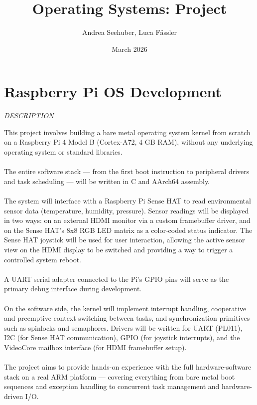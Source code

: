 \documentclass{article}
\title{Operating Systems: Project}
\author{Andrea Seehuber, Luca Fässler}
\date{March 2026}
\begin{document}
\maketitle

\appendix

\section*{Raspberry Pi OS Development}

\begin{center}
  \textit{DESCRIPTION}
\end{center}
This project involves building a bare metal operating system kernel from scratch on a Raspberry Pi 4 Model B (Cortex-A72, 4 GB RAM), without any underlying operating system or standard libraries.
\\\\
The entire software stack — from the first boot instruction to peripheral drivers and task scheduling — will be written in C and AArch64 assembly.
\\\\
The system will interface with a Raspberry Pi Sense HAT to read environmental sensor data (temperature, humidity, pressure). Sensor readings will be displayed in two ways: on an external HDMI monitor via a custom framebuffer driver, and on the Sense HAT's 8x8 RGB LED matrix as a color-coded status indicator. The Sense HAT joystick will be used for user interaction, allowing the active sensor view on the HDMI display to be switched and providing a way to trigger a controlled system reboot.
\\\\
A UART serial adapter connected to the Pi's GPIO pins will serve as the primary debug interface during development.
\\\\
On the software side, the kernel will implement interrupt handling, cooperative and preemptive context switching between tasks, and synchronization primitives such as spinlocks and semaphores. Drivers will be written for UART (PL011), I2C (for Sense HAT communication), GPIO (for joystick interrupts), and the VideoCore mailbox interface (for HDMI framebuffer setup).
\\\\
The project aims to provide hands-on experience with the full hardware-software stack on a real ARM platform — covering everything from bare metal boot sequences and exception handling to concurrent task management and hardware-driven I/O.
\end{document}
